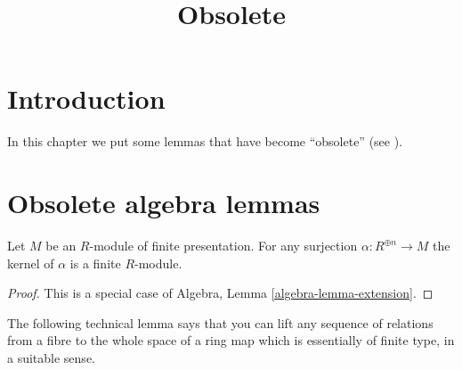 

%


\title{Obsolete}

\maketitle

\label{section-phantom}

\tableofcontents




\section{Introduction}
\label{section-introduction}

\noindent
In this chapter we put some lemmas that have become ``obsolete''
(see \cite{Miller}).



\section{Obsolete algebra lemmas}
\label{section-algebra}

\begin{lemma}
\label{lemma-finite-presentation-module-independent}
Let $M$ be an $R$-module of finite presentation.
For any surjection $\alpha : R^{\oplus n} \to M$ the
kernel of $\alpha$ is a finite $R$-module.
\end{lemma}

\begin{proof}
This is a special case of Algebra, Lemma \ref{algebra-lemma-extension}.
\end{proof}

\noindent
The following technical lemma says that you can lift any sequence
of relations from a fibre to the whole space of a ring
map which is essentially of finite type, in a suitable sense.

